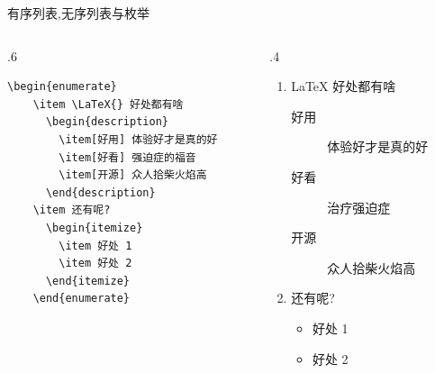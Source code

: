     
    \begin{frame}[fragile]{有序列表,无序列表与枚举}
    \begin{columns}
    \begin{column}{.6\textwidth}
    \begin{lstlisting}[basicstyle=\ttfamily\small]
    \begin{enumerate}
    \item \LaTeX{} 好处都有啥
      \begin{description}
        \item[好用] 体验好才是真的好
        \item[好看] 强迫症的福音
        \item[开源] 众人拾柴火焰高
      \end{description}
    \item 还有呢?
      \begin{itemize}
        \item 好处 1
        \item 好处 2
      \end{itemize}
    \end{enumerate}
    \end{lstlisting}
    \end{column}
    \begin{column}{.4\textwidth}
    {\small
    \begin{enumerate}
    \item \LaTeX{} 好处都有啥
      \begin{description}
        \item[好用] 体验好才是真的好
        \item[好看] 治疗强迫症
        \item[开源] 众人拾柴火焰高
      \end{description}
    \item 还有呢?
      \begin{itemize}
        \item 好处 1
        \item 好处 2
      \end{itemize}
    \end{enumerate}
    }
    \end{column}
    \end{columns}
    
    \end{frame}
    
